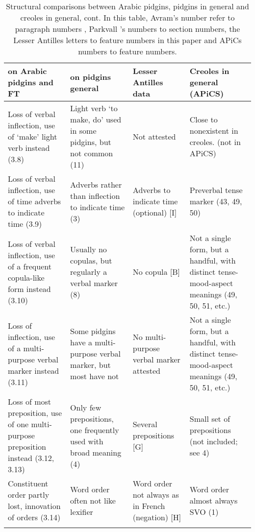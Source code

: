 \documentclass[output=paper,colorlinks,citecolor=brown]{langscibook}
\begin{document}
\begin{sidewaystable} %
\caption{Structural comparisons between Arabic pidgins, pidgins in general and creoles in general, cont. In this table, Avram’s number refer to paragraph numbers \citep{Avram2017}, Parkvall ’s  numbers  to section numbers, the Lesser Antilles letters to feature numbers in this paper and APiCs numbers to feature numbers.}
\label{tab:2 bakker:1b} 
\scriptsize
\begin{tabularx}{\textwidth}{QQp{2.5cm}Q}
\lsptoprule
{\citet{Avram2017} on Arabic pidgins and FT} &
{\citet{Parkvall2017} on pidgins general} &
{Lesser Antilles data} &
{Creoles in general (APiCS)}\\
\midrule
Loss of verbal inflection, use of `make'  light verb instead (3.8) &
Light verb `to make, do'  used in some pidgins, but not common (11)&
Not attested &
Close to nonexistent in creoles. (not in APiCS)\\
\midrule
Loss of verbal inflection, use of time adverbs to indicate time (3.9) &
Adverbs rather than inflection to indicate time (3) &
Adverbs to indicate time (optional) [I] &
Preverbal tense marker (43, 49, 50)\\
\midrule
Loss of verbal inflection, use of a frequent copula-like form instead (3.10) &
Usually no copulas, but regularly a verbal marker (8)&
No copula [B] &
Not a single form, but a handful, with distinct tense-mood-aspect meanings (49, 50, 51, etc.)\\
\midrule
Loss of inflection, use of a multi-purpose verbal marker instead (3.11) &
Some pidgins have a multi-purpose verbal marker, but most have not &
No multi-purpose verbal marker attested &
Not a single form, but a handful, with distinct tense-mood-aspect meanings (49, 50, 51, etc.)\\
\midrule
Loss of most preposition, use of one multi-purpose preposition instead (3.12, 3.13) &
Only few prepositions, one frequently used with broad meaning (4) &
Several prepositions [G] &
Small set of prepositions (not included; see 4)\\
\midrule
Constituent order partly lost, innovation of orders (3.14) &
Word order often not like lexifier &
Word order not always as in French (negation) [H] &
Word order almost always SVO (1)\\

\lspbottomrule
\end{tabularx}
\end{sidewaystable}
\end{document}
